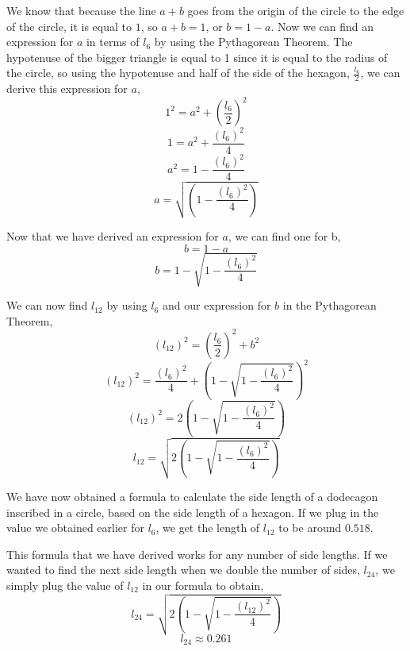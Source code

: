 \documentclass{article}
\begin{document}
\par We know that because the line $a+b$ goes from the origin of the circle to the edge of the circle, it is equal to $1$, so $a+b=1$, or $b=1-a$. Now we can find an expression for $a$ in terms of $l_6$ by using the Pythagorean Theorem. The hypotenuse of the bigger triangle is equal to 1 since it is equal to the radius of the circle, so using the hypotenuse and half of the side of the hexagon, $\frac{l_6}{2}$, we can derive this expression for $a$,
\begin{equation*}
    1^2 = a^2 + \left( \frac{l_6}{2} \right)^2
\end{equation*}
\begin{equation*}
    1 = a^2 + \frac{(l_6)^2}{4}
\end{equation*}
\begin{equation*}
    a^2 = 1 - \frac{(l_6)^2}{4}
\end{equation*}
\begin{equation*}
    a = \sqrt{ \left( 1 - \frac{(l_6)^2}{4} \right) }
\end{equation*}

Now that we have derived an expression for $a$, we can find one for b,
\begin{equation*}
    b = 1 - a
\end{equation*}
\begin{equation*}
    b = 1 - \sqrt{1-\frac{(l_6)^2}{4}}
\end{equation*}

We can now find $l_{12}$ by using $l_6$ and our expression for $b$ in the Pythagorean Theorem,
\begin{equation*}
    (l_{12})^2 = \left( \frac{l_6}{2} \right)^2 + b^2
\end{equation*}
\begin{equation*}
    (l_{12})^2 = \frac{(l_6)^2}{4} + \left(1 - \sqrt{1-\frac{(l_6)^2}{4}}\right)^2
\end{equation*}
\begin{equation*}
    (l_{12})^2 = 2\left(1-\sqrt{1-\frac{(l_6)^2}{4}}\right)
\end{equation*}
\begin{equation*}
    l_{12} = \sqrt{2\left(1-\sqrt{1-\frac{(l_6)^2}{4}}\right)}
\end{equation*}

We have now obtained a formula to calculate the side length of a dodecagon inscribed in a circle, based on the side length of a hexagon. If we plug in the value we obtained earlier for $l_6$, we get the length of $l_{12}$ to be around $0.518$.
\par This formula that we have derived works for any number of side lengths. If we wanted to find the next side length when we double the number of sides, $l_{24}$, we simply plug the value of $l_{12}$ in our formula to obtain,
\begin{equation*}
    l_{24} = \sqrt{2\left(1-\sqrt{1-\frac{(l_{12})^2}{4}}\right)}
\end{equation*}
\begin{equation*}
    l_{24} \approx 0.261
\end{equation*}
\end{document}
